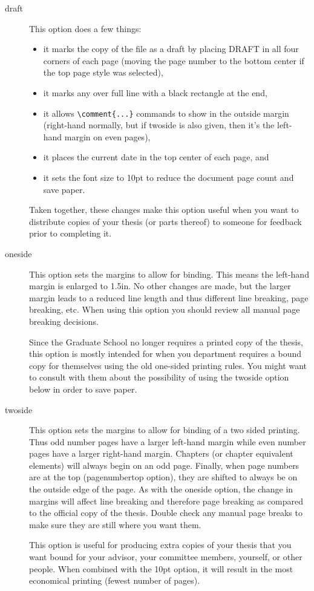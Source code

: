 \begin{description}
\item[draft]{This option does a few things:
	\begin{itemize}
	\item{it marks the copy of the file as a draft by placing DRAFT in all four corners of each page (moving the page number to the bottom center if the top page style was selected),}
	\item{it marks any over full line with a black rectangle at the end,}
	\item{it allows \verb=\comment{...}= commands to show in the outside margin (right-hand normally, but if twoside is also given, then it's the left-hand margin on even pages),}
	\item{it places the current date in the top center of each page, and}
	\item{it sets the font size to 10pt to reduce the document page count and save paper.}
	\end{itemize}
Taken together, these changes make this option useful when you want to distribute copies of your thesis (or parts thereof) to someone for feedback prior to completing it.}
\item[oneside]{This option sets the margins to allow for binding.  This means the left-hand margin is enlarged to 1.5in.  No other changes are made, but the larger margin leads to a reduced line length and thus different line breaking, page breaking, etc.  When using this option you should review all manual page breaking decisions.

Since the Graduate School no longer requires a printed copy of the thesis, this option is mostly intended for when you department requires a bound copy for themselves using the old one-sided printing rules.  You might want to consult with them about the possibility of using the twoside option below in order to save paper.}
\item[twoside]{This option sets the margins to allow for binding of a two sided printing.  Thus odd number pages have a larger left-hand margin while even number pages have a larger right-hand margin.  Chapters (or chapter equivalent elements) will always begin on an odd page.  Finally, when page numbers are at the top (pagenumbertop option), they are shifted to always be on the outside edge of the page.  As with the oneside option, the change in margins will affect line breaking and therefore page breaking as compared to the official copy of the thesis.  Double check any manual page breaks to make sure they are still where you want them.

This option is useful for producing extra copies of your thesis that you want bound for your advisor, your committee members, yourself, or other people.  When combined with the 10pt option, it will result in the most economical printing (fewest number of pages).}
\end{description}
